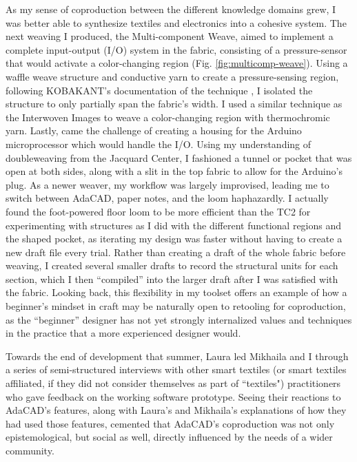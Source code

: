 As my sense of coproduction between the different knowledge domains grew, I was better able to synthesize textiles and electronics into a cohesive system. The next weaving I produced, the Multi-component Weave, aimed to implement a complete input-output (I/O) system in the fabric, consisting of a pressure-sensor that would activate a color-changing region (Fig. \ref{fig:multicomp-weave}). Using a waffle weave structure and conductive yarn to create a pressure-sensing region, following KOBAKANT's documentation of the technique \cite{noauthor_kobakant_nodate}, I isolated the structure to only partially span the fabric's width. I used a similar technique as the Interwoven Images to weave a color-changing region with thermochromic yarn. Lastly, came the challenge of creating a housing for the Arduino microprocessor which would handle the I/O. Using my understanding of doubleweaving from the Jacquard Center, I fashioned a tunnel or pocket that was open at both sides, along with a slit in the top fabric to allow for the Arduino's plug. As a newer weaver, my workflow was largely improvised, leading me to switch between AdaCAD, paper notes, and the loom haphazardly. I actually found the foot-powered floor loom to be more efficient than the TC2 for experimenting with structures as I did with the different functional regions and the shaped pocket, as iterating my design was faster without having to create a new draft file every trial. Rather than creating a draft of the whole fabric before weaving, I created several smaller drafts to record the structural units for each section, which I then ``compiled'' into the larger draft after I was satisfied with the fabric. Looking back, this flexibility in my toolset offers an example of how a beginner's mindset in craft may be naturally open to retooling for coproduction, as the ``beginner'' designer has not yet strongly internalized values and techniques in the practice that a more experienced designer would.

Towards the end of development that summer, Laura led Mikhaila and I through a series of semi-structured interviews with other smart textiles (or smart textiles affiliated, if they did not consider themselves as part of ``textiles") practitioners who gave feedback on the working software prototype. Seeing their reactions to AdaCAD's features, along with Laura's and Mikhaila's explanations of how they had used those features, cemented that AdaCAD's coproduction was not only epistemological, but social as well, directly influenced by the needs of a wider community. 

